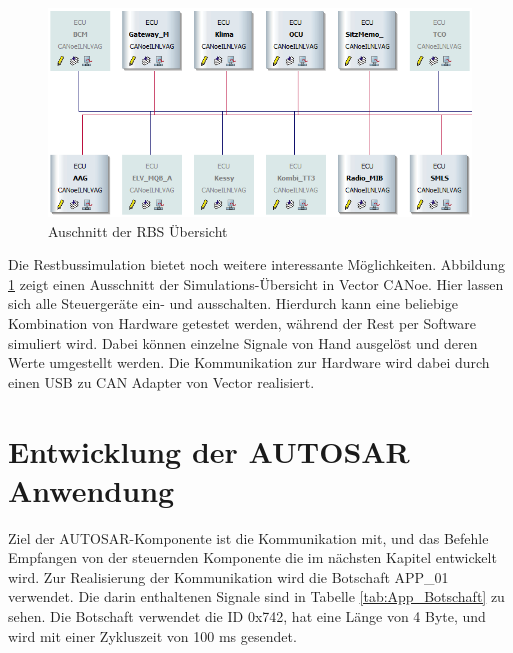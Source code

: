 \documentclass[
  a4paper,					    %
  twoside,
  DIV=calc,     				%
  bibliography=totoc,
  cleardoublepage=empty,
  ngerman,     					%
  final       					%
]{scrbook}
\begin{document}
\begin{figure}[ht]
    \centering
    \includegraphics[width=\textwidth]{rbs_ausschnitt}
    \caption{Auschnitt der RBS Übersicht}
    \label{fig:rbs}
\end{figure}

Die Restbussimulation bietet noch weitere interessante Möglichkeiten. Abbildung \ref{fig:rbs} zeigt einen Ausschnitt der Simulations-Übersicht in Vector CANoe. Hier lassen sich alle Steuergeräte ein- und ausschalten. Hierdurch kann eine beliebige Kombination von Hardware getestet werden, während der Rest per Software simuliert wird. Dabei können einzelne Signale von Hand ausgelöst und deren Werte umgestellt werden. Die Kommunikation zur Hardware wird dabei durch einen USB zu CAN Adapter von Vector realisiert.










\section{Entwicklung der AUTOSAR Anwendung}
\label{sec:entwicklung_autosar}
Ziel der AUTOSAR-Komponente ist die Kommunikation mit, und das Befehle Empfangen von der steuernden Komponente die im nächsten Kapitel entwickelt wird. Zur Realisierung der Kommunikation wird die Botschaft APP\_01 verwendet. Die darin enthaltenen Signale sind in Tabelle \ref{tab:App_Botschaft} zu sehen. Die Botschaft verwendet die ID 0x742, hat eine Länge von 4 Byte, und wird mit einer Zykluszeit von 100 ms gesendet.
\end{document}

